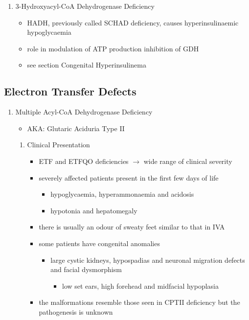 \documentclass{scrartcl}
\begin{document}
\begin{enumerate}
\item 3-Hydroxyacyl-CoA Dehydrogenase Deficiency
\label{sec:orgc16e630}
\begin{itemize}
\item HADH, previously called SCHAD deficiency, causes hyperinsulinaemic
hypoglycaemia
\item role in modulation of ATP production inhibition of GDH
\item see section Congenital Hyperinsulinema
\end{itemize}
\end{enumerate}
\subsection{Electron Transfer Defects}
\label{sec:org853bd10}
\begin{enumerate}
\item Multiple Acyl-CoA Dehydrogenase Deficiency
\label{sec:orga54f58e}
\begin{itemize}
\item AKA: Glutaric Aciduria Type II
\end{itemize}
\begin{enumerate}
\item Clinical Presentation
\label{sec:org0c80073}
\begin{itemize}
\item ETF and ETFQO deficiencies \(\to\) wide range of clinical severity
\item severely affected patients present in the first few days of life
\begin{itemize}
\item hypoglycaemia, hyperammonaemia and acidosis
\item hypotonia and hepatomegaly
\end{itemize}
\item there is usually an odour of sweaty feet similar to that in IVA
\item some patients have congenital anomalies
\begin{itemize}
\item large cystic kidneys, hypospadias and neuronal migration defects and facial dysmorphism
\begin{itemize}
\item low set ears, high forehead and midfacial hypoplasia
\end{itemize}
\end{itemize}
\item the malformations resemble those seen in CPTII deficiency but the pathogenesis is unknown

\end{itemize}
\end{enumerate}
\end{enumerate}
\end{document}
